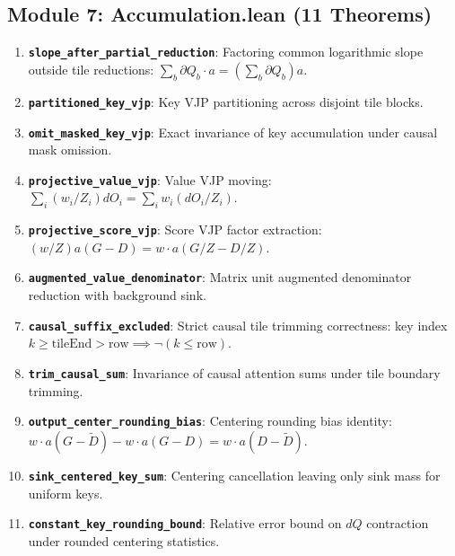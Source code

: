 \documentclass[11pt,a4paper]{article}
\theoremstyle{definition}
\begin{document}
\subsection{Module 7: Accumulation.lean (11 Theorems)}
\begin{enumerate}
    \item \textbf{\texttt{slope\_after\_partial\_reduction}}: Factoring common logarithmic slope outside tile reductions: $\sum_b \partial Q_b \cdot a = (\sum_b \partial Q_b) a$.
    \item \textbf{\texttt{partitioned\_key\_vjp}}: Key VJP partitioning across disjoint tile blocks.
    \item \textbf{\texttt{omit\_masked\_key\_vjp}}: Exact invariance of key accumulation under causal mask omission.
    \item \textbf{\texttt{projective\_value\_vjp}}: Value VJP moving: $\sum_i (w_i / Z_i) dO_i = \sum_i w_i (dO_i / Z_i)$.
    \item \textbf{\texttt{projective\_score\_vjp}}: Score VJP factor extraction: $(w/Z) a (G - D) = w \cdot a (G/Z - D/Z)$.
    \item \textbf{\texttt{augmented\_value\_denominator}}: Matrix unit augmented denominator reduction with background sink.
    \item \textbf{\texttt{causal\_suffix\_excluded}}: Strict causal tile trimming correctness: key index $k \ge \text{tileEnd} > \text{row} \implies \neg (k \le \text{row})$.
    \item \textbf{\texttt{trim\_causal\_sum}}: Invariance of causal attention sums under tile boundary trimming.
    \item \textbf{\texttt{output\_center\_rounding\_bias}}: Centering rounding bias identity: $w \cdot a (G - \widetilde{D}) - w \cdot a (G - D) = w \cdot a (D - \widetilde{D})$.
    \item \textbf{\texttt{sink\_centered\_key\_sum}}: Centering cancellation leaving only sink mass for uniform keys.
    \item \textbf{\texttt{constant\_key\_rounding\_bound}}: Relative error bound on $dQ$ contraction under rounded centering statistics.
\end{enumerate}
\end{document}
